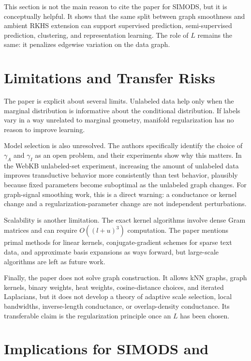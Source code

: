 \documentclass[11pt]{article}
\begin{document}
This section is not the main reason to cite the paper for SIMODS, but it is
conceptually helpful.  It shows that the same split between graph smoothness
and ambient RKHS extension can support supervised prediction,
semi-supervised prediction, clustering, and representation learning.  The
role of $L$ remains the same: it penalizes edgewise variation on the data
graph.

\section{Limitations and Transfer Risks}

The paper is explicit about several limits.  Unlabeled data help only when
the marginal distribution is informative about the conditional distribution.
If labels vary in a way unrelated to marginal geometry, manifold
regularization has no reason to improve learning.

Model selection is also unresolved.  The authors specifically identify the
choice of $\gamma_A$ and $\gamma_I$ as an open problem, and their experiments
show why this matters.  In the WebKB unlabeled-set experiment, increasing the
amount of unlabeled data improves transductive behavior more consistently
than test behavior, plausibly because fixed parameters become suboptimal as
the unlabeled graph changes.  For graph-signal smoothing work, this is a
direct warning: a conductance or kernel change and a regularization-parameter
change are not independent perturbations.

Scalability is another limitation.  The exact kernel algorithms involve dense
Gram matrices and can require $O((l+u)^3)$ computation.  The paper mentions
primal methods for linear kernels, conjugate-gradient schemes for sparse text
data, and approximate basis expansions as ways forward, but large-scale
algorithms are left as future work.

Finally, the paper does not solve graph construction.  It allows kNN graphs,
graph kernels, binary weights, heat weights, cosine-distance choices, and
iterated Laplacians, but it does not develop a theory of adaptive scale
selection, local bandwidths, inverse-length conductance, or overlap-density
conductance.  Its transferable claim is the regularization principle once an
$L$ has been chosen.

\section{Implications for SIMODS and }
\end{document}

